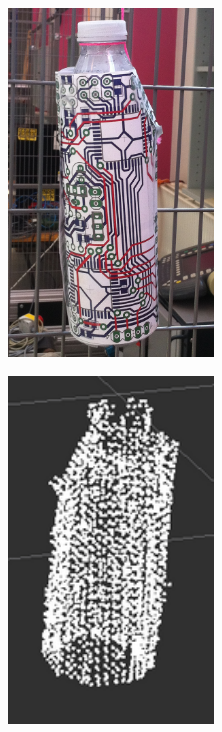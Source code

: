 \begin{figure}[htb]
	\centering
        \begin{subfigure}[b]{0.4\textwidth}
        \begin{center}
			\includegraphics[width=0.6\textwidth]{graphics/07_modelling/bottle_image.png}
			\end{center}
        \end{subfigure}
        \begin{subfigure}[b]{0.4\textwidth}
        \begin{center}
			\includegraphics[width=0.6\textwidth]{graphics/07_modelling/bottle.png}

\end{center}
\end{subfigure}
\end{figure}
